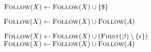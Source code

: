 
\begin{algorithm}[H]
\begin{algorithmic}[1]
    \pause
      
      \State $\textsc{Follow}(X) \gets \textsc{Follow}(X) \cup \{\$\}$
    \EndFor

    \pause
    \hStatex
     
      \State $\textsc{Follow}(X) \gets \textsc{Follow}(X) \cup \textsc{Follow}(A)$
    \EndFor

    \pause
    \hStatex
     
      \State $\textsc{Follow}(X) \gets \textsc{Follow}(X) \cup (\textsc{First}(\beta) \setminus \{\epsilon\})$
      \pause
      \If{\red{$\epsilon \in \first(\beta)$}}
        \State $\textsc{Follow}(X) \gets \textsc{Follow}(X) \cup \textsc{Follow}(A)$
      \EndIf
    \EndFor
  \EndProcedure
\end{algorithmic}
\end{algorithm}